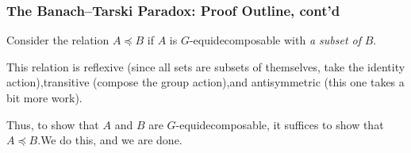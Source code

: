 \documentclass{beamer-custom}
\begin{document}
\begin{frame}
  \frametitle{The Banach--Tarski Paradox: Proof Outline, cont'd}
  Consider the relation $A\preceq B$ if $A$ is $G$-equidecomposable with \textit{a subset of} $B$.\pause\newline

  This relation is reflexive (since all sets are subsets of themselves, take the identity action),\pause\:transitive (compose the group action),\pause\:and antisymmetric (this one takes a bit more work).\pause\newline

  Thus, to show that $A$ and $B$ are $G$-equidecomposable, it suffices to show that $A\preceq B$.\pause\:We do this, and we are done.
\end{frame}
\end{document}
